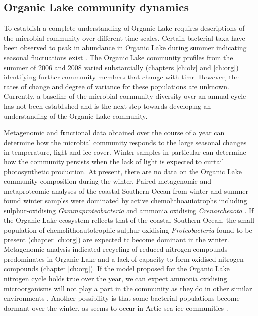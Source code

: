 \subsection{Organic Lake community dynamics}
To establish a complete understanding of Organic Lake requires descriptions of the microbial community over different time scales.
Certain bacterial taxa have been observed to peak in abundance in Organic Lake during summer indicating seasonal fluctuations exist \cite{James1994}.
The Organic Lake community profiles from the summer of 2006 and 2008 varied substantially (chapters \ref{ch:olv} and \ref{ch:org}) identifying further community members that change with time.
However, the rates of change and degree of variance for these populations are unknown.
Currently, a baseline of the microbial community diversity over an annual cycle has not been established and is the next step towards developing an understanding of the Organic Lake community.

Metagenomic and functional data obtained over the course of a year can determine how the microbial community responds to the large seasonal changes in temperature, light and ice-cover.
Winter samples in particular can determine how the community persists when the lack of light is expected to curtail photosynthetic production.
At present, there are no data on the Organic Lake community composition during the winter.
Paired metagenomic and metaproteomic analyses of the coastal Southern Ocean from winter and summer found winter samples were dominated by active chemolithoautotrophs including sulphur-oxidising \emph{Gammaproteobacteria} and ammonia oxidising \emph{Crenarcheaota} \cite{Grzymski2012, Williams2012b}.
If the Organic Lake ecosystem reflects that of the coastal Southern Ocean, the small population of chemolithoautotrophic sulphur-oxidising \emph{Proteobacteria} found to be present (chapter \ref{ch:org}) are expected to become dominant in the winter.
Metagenomic analysis indicated recycling of reduced nitrogen compounds predominates in Organic Lake and a lack of capacity to form oxidised nitrogen compounds (chapter \ref{ch:org}).
If the model proposed for the Organic Lake nitrogen cycle holds true over the year, we can expect ammonia oxidising microorganisms will not play a part in the community as they do in other similar environments \cite{Voytek1999, Grzymski2012, Williams2012b}.
Another possibility is that some bacterial populations become dormant over the winter, as seems to occur in Artic sea ice communities \cite{Collins2010}.

